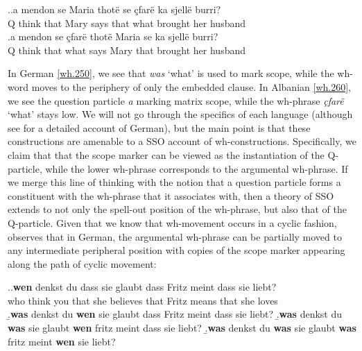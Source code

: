 \documentclass[charis]{glossa}
\begin{document}
\ex.\label{wh.260}\ag.\label{wh.260a}a mendon se Maria thot\"e se \c{c}far\"e ka sjell\"e burri?\\
   Q think that Mary says that what brought her husband\\
   \bg.\label{wh.260b}a mendon se \c{c}far\"e thot\"e Maria se ka sjell\"e burri?\\
   Q think that what says Mary that brought her husband\\

In German \ref{wh.250}, we see that \textit{was} `what' is used to mark scope, while the wh-word moves to the periphery of only the embedded clause. In Albanian \ref{wh.260}, we see the question particle \textit{a} marking matrix scope, while the wh-phrase \textit{\c{c}far\"e} `what' stays low. We will not go through the specifics of each language (although see \citealp{fanselow-cavar:2000} for a detailed account of German), but the main point is that these constructions are amenable to a SSO account of wh-constructions. Specifically, we claim that that the scope marker can be viewed as the instantiation of the Q-particle, while the lower wh-phrase corresponds to the argumental wh-phrase. If we merge this line of thinking with the notion that a question particle forms a constituent with the wh-phrase that it associates with, then a theory of SSO extends to not only the spell-out position of the wh-phrase, but also that of the Q-particle. Given that we know that wh-movement occurs in a cyclic fashion, \cite{fanselow:2006} observes that in German, the argumental wh-phrase can be partially moved to any intermediate peripheral position with copies of the scope marker appearing along the path of cyclic movement:

\ex.\label{wh.270}\ag.\label{wh.270a}\textbf{wen} denkst du dass sie glaubt dass Fritz meint dass sie liebt?\\
   who think you that she believes that Fritz means that she loves\\
   \b.\textbf{was} denkst du \textbf{wen} sie glaubt dass Fritz meint dass sie liebt?
   \b.\textbf{was} denkst du \textbf{was} sie glaubt \textbf{wen} fritz meint dass sie liebt?
   \b.\textbf{was} denkst du \textbf{was} sie glaubt \textbf{was} fritz meint \textbf{wen} sie liebt?
\end{document}
